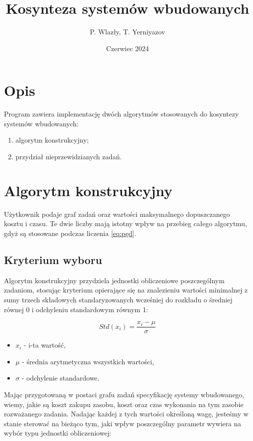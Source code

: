 \documentclass[a4paper,11pt]{article}
\title{Kosynteza systemów wbudowanych}
\author{P. Wlazły, T. Yerniyazov}
\date{Czerwiec 2024}
\begin{document}
\maketitle

\section{Opis}

Program zawiera implementację dwóch algorytmów stosowanych do kosyntezy systemów
wbudowanych:

\begin{enumerate}
    \item algorytm konstrukcyjny;
    \item przydział nieprzewidzianych zadań.
\end{enumerate}

\section{Algorytm konstrukcyjny}
Użytkownik podaje graf zadań oraz wartości maksymalnego dopuszczanego kosztu 
i czasu. Te dwie liczby mają istotny wpływ na przebieg całego algorytmu, gdyż
są stosowane podczas liczenia \ref{eq:pęd}.

\subsection{Kryterium wyboru}
Algorytm konstrukcyjny przydziela jednostki obliczeniowe poszczególnym 
zadaniom, stosując kryterium opierające się na znalezieniu wartości minimalnej z sumy trzech składowych standaryzowanych wcześniej do rozkładu 
o średniej równej 0 i odchyleniu standardowym równym 1:

\begin{equation}
    {Std}({x_i}) = \frac{x_i - \mu}{\sigma}
\end{equation}
\begin{itemize}
\item \(x_i\) - i-ta wartość,
\item \(\mu\) - średnia arytmetyczna wszystkich wartości,
\item \(\sigma\) - odchylenie standardowe.
\end{itemize}

Mając przygotowaną w postaci grafu zadań specyfikację systemy wbudowanego, wiemy,
jakie są koszt zakupu zasobu, koszt oraz czas wykonania na tym zasobie
rozważanego zadania. Nadając każdej z tych wartości określoną wagę, jesteśmy
w stanie sterować na bieżąco tym, jaki wpływ poszczególny parametr wywiera na
wybór typu jednostki obliczeniowej:
\end{document}
